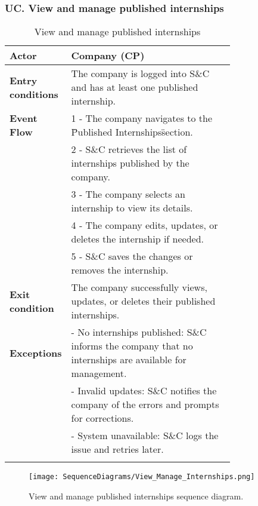 \subsubsection*{UC\cuc . View and manage published internships}
\begin{center}
    \begin{longtable}{|l|p{0.75\linewidth}|}
        \hline
        \textbf{Actor}            & Company (CP) \\
        \hline
        \textbf{Entry conditions} & The company is logged into S\&C and has at least one published internship. \\
        \hline
        \textbf{Event Flow}       & 1 - The company navigates to the \"Published Internships\" section. \\
        & 2 - S\&C retrieves the list of internships published by the company. \\
        & 3 - The company selects an internship to view its details. \\
        & 4 - The company edits, updates, or deletes the internship if needed. \\
        & 5 - S\&C saves the changes or removes the internship. \\
        \hline
        \textbf{Exit condition}   & The company successfully views, updates, or deletes their published internships. \\       
        \hline
        \textbf{Exceptions}       & - No internships published: S\&C informs the    company that no internships are available for management. \\
                                  & - Invalid updates: S\&C notifies the company of the errors and prompts for corrections. \\
                                  & - System unavailable: S\&C logs the issue and retries later. \\
        \hline
        \caption{View and manage published internships}
        \label{tab:view_manage_internships_usecase}
    \end{longtable}
\end{center}

\begin{figure}[H]
    \begin{center}
        \texttt{[image: SequenceDiagrams/View\_Manage\_Internships.png]}
        \caption{View and manage published internships sequence diagram.}
        \label{fig:view_manage_internships_seqd}%
    \end{center}
\end{figure}


